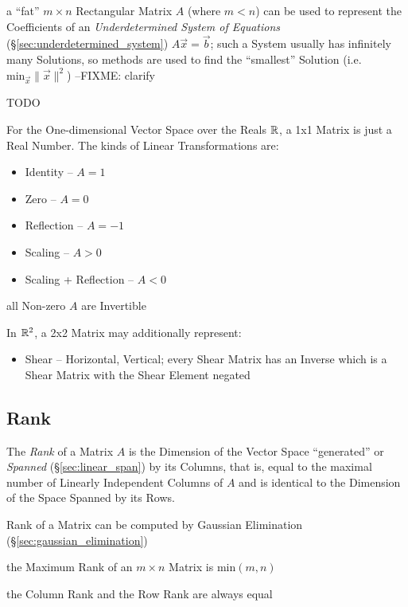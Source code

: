 a ``fat'' $m \times n$ Rectangular Matrix $A$ (where $m < n$) can be used to
represent the Coefficients of an \emph{Underdetermined System of Equations}
(\S\ref{sec:underdetermined_system}) $A\vec{x} = \vec{b}$; such a System
usually has infinitely many Solutions, so methods are used to find the
``smallest'' Solution (i.e. $\mathrm{min}_{\vec{x}} \|\vec{x}\|^2$)
--FIXME: clarify


\asterism

TODO

For the One-dimensional Vector Space over the Reals $\mathbb{R}$, a 1x1 Matrix is
just a Real Number. The kinds of Linear Transformations are:
\begin{itemize}
  \item Identity -- $A = 1$
  \item Zero -- $A = 0$
  \item Reflection -- $A = -1$
  \item Scaling -- $A > 0$
  \item Scaling + Reflection -- $A < 0$
\end{itemize}
all Non-zero $A$ are Invertible

In $\mathbb{R}^2$, a 2x2 Matrix may additionally represent:
\begin{itemize}
  \item Shear -- Horizontal, Vertical; every Shear Matrix has an Inverse which
    is a Shear Matrix with the Shear Element negated
\end{itemize}



\subsection{Rank}\label{sec:rank}

The \emph{Rank} of a Matrix $A$ is the Dimension of the Vector Space
``generated'' or \emph{Spanned} (\S\ref{sec:linear_span}) by its Columns, that
is, equal to the maximal number of Linearly Independent Columns of $A$ and is
identical to the Dimension of the Space Spanned by its Rows.

\fist Rank of a Matrix can be computed by Gaussian Elimination
(\S\ref{sec:gaussian_elimination})

the Maximum Rank of an $m \times n$ Matrix is $\mathrm{min}(m,n)$

the Column Rank and the Row Rank are always equal

